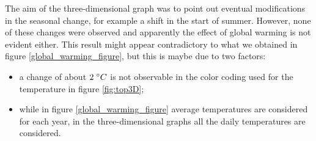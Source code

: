 \medskip
\medskip
The aim of the three-dimensional graph was to point out eventual modifications in the seasonal change, for example a shift in the start of summer. However, none of these changes were observed and apparently the effect of global warming is not evident either. This result might appear contradictory to what we obtained in figure \ref{global_warming_figure}, but this is maybe due to two factors:
\begin{itemize}
\item a change of about $2 \hspace{1mm} ^\circ C$ is not observable in the color coding used for the temperature in figure \ref{fig:top3D};
\item while in figure \ref{global_warming_figure} average temperatures are considered for each year, in the three-dimensional graphs all the daily temperatures are considered.
\end{itemize}

 
 
